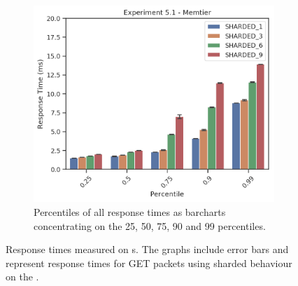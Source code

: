 \begin{figure}
\begin{subfigure}[t!]{0.56\textwidth}
                \includegraphics[width=\textwidth]{../data_analysis/figures/5-1_mt_percentiles_bar.png}
                \caption{Percentiles of all response times as barcharts concentrating on the 25, 50, 75, 90 and 99
                percentiles.\label{fig:shard_mt_rt_percentiles-bar}}
            \end{subfigure}
            \caption{Response times measured on \cli{}s. The graphs include error bars and represent response times
            for GET packets using sharded behaviour on the \mw.\label{fig:shard_mt}}
        \end{figure}

